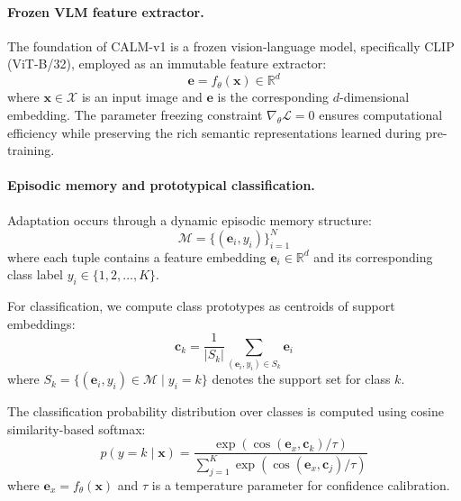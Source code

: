 \documentclass{article}
\begin{document}
\paragraph{Frozen VLM feature extractor.}
The foundation of CALM-v1 is a frozen vision-language model, specifically CLIP (ViT-B/32), employed as an immutable feature extractor:
\begin{equation}
\mathbf{e} = f_\theta(\mathbf{x}) \in \mathbb{R}^d
\end{equation}
where $\mathbf{x} \in \mathcal{X}$ is an input image and $\mathbf{e}$ is the corresponding $d$-dimensional embedding. The parameter freezing constraint $\nabla_\theta \mathcal{L} = 0$ ensures computational efficiency while preserving the rich semantic representations learned during pre-training.

\paragraph{Episodic memory and prototypical classification.}
Adaptation occurs through a dynamic episodic memory structure:
\begin{equation}
\mathcal{M} = \{(\mathbf{e}_i, y_i)\}_{i=1}^N
\end{equation}
where each tuple contains a feature embedding $\mathbf{e}_i \in \mathbb{R}^d$ and its corresponding class label $y_i \in \{1,2,\ldots,K\}$.

For classification, we compute class prototypes as centroids of support embeddings:
\begin{equation}
\mathbf{c}_k = \frac{1}{|S_k|} \sum_{(\mathbf{e}_i, y_i) \in S_k} \mathbf{e}_i \label{eq:prototype}
\end{equation}
where $S_k = \{(\mathbf{e}_i, y_i) \in \mathcal{M} \mid y_i = k\}$ denotes the support set for class $k$.

The classification probability distribution over classes is computed using cosine similarity-based softmax:
\begin{equation}
p(y=k\mid\mathbf{x}) = \frac{\exp(\cos(\mathbf{e}_x, \mathbf{c}_k) / \tau)}{\sum_{j=1}^{K} \exp(\cos(\mathbf{e}_x, \mathbf{c}_j) / \tau)} \label{eq:classification}
\end{equation}
where $\mathbf{e}_x = f_\theta(\mathbf{x})$ and $\tau$ is a temperature parameter for confidence calibration.
\end{document}
